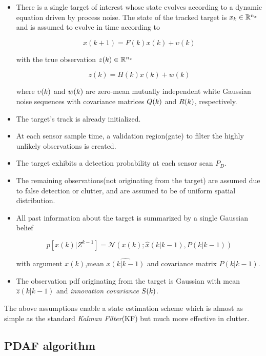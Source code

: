 \begin{itemize}
	\item There is a single target of interest whose state evolves according to a dynamic equation driven by process noise. The state of the tracked target is $x_k \in {\mathbb{R}}^{n_x} $ and is assumed to evolve in time according to 
	
	\begin{equation}\label{eq:stateEvolution}
	x(k+1) = F(k)x(k) + \upsilon(k)
	\end{equation}
	
	with the true observation $z(k) \in {\mathbb{R}}^{n_z}$ 
	
	\[ z(k) = H(k)x(k) + w(k) \]

	where ${\upsilon}(k)$ and ${w}(k)$ are zero-mean mutually independent white Gaussian noise sequences with covariance matrices ${Q}(k)$ and ${R}(k)$, respectively.
	\item The target's track is already initialized.
	\item At each sensor sample time, a validation region(gate) to filter the highly unlikely observations is created\cite{Shalom1995}.
	\item The target exhibits a detection probability at each sensor scan $P_D$.
	\item The remaining observations(not originating from the target) are assumed due to false detection or clutter, and are assumed to be of uniform spatial distribution.
	\item All past information about the target is summari\cite{BarShalom1980}zed by a single Gaussian belief	
	
	
	\begin{equation}\label{eq:gaussAssumption}
	p[x(k)|Z^{k-1}] = \mathcal{N}\left(x(k);\hat{x}(k|k-1),P(k|k-1)\right)
	\end{equation}
	
	
	
	with argument $x(k)$,mean $\hat{x(k|k-1)}$ and covariance matrix $P(k|k-1)$.
	\item The observation pdf originating from the target is Gaussian with mean $\hat{z}(k|k-1)$ and \emph{innovation covariance}  ${S}(k)$.
\end{itemize}
The above assumptions enable a state estimation scheme which is almost as simple as the standard \emph{Kalman Filter}(KF) but much more effective in clutter.
\subsection{PDAF algorithm}

